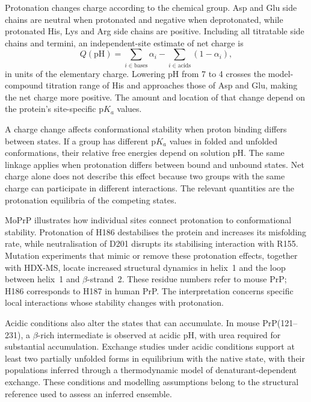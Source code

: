 Protonation changes charge according to the chemical group. Asp and Glu side chains are neutral when protonated and negative when deprotonated, while protonated His, Lys and Arg side chains are positive. Including all titratable side chains and termini, an independent-site estimate of net charge is
\begin{equation}
    Q(\mathrm{pH})=
    \sum_{i\in\text{bases}}\alpha_i
    -\sum_{i\in\text{acids}}(1-\alpha_i),
    \label{eq:bg-net-charge}
\end{equation}
in units of the elementary charge.\supercite{paceProteinIonizableGroups2009} Lowering pH from 7 to 4 crosses the model-compound titration range of His and approaches those of Asp and Glu, making the net charge more positive. The amount and location of that change depend on the protein's site-specific $\mathrm{p}K_a$ values.

A charge change affects conformational stability when proton binding differs between states. If a group has different $\mathrm{p}K_a$ values in folded and unfolded conformations, their relative free energies depend on solution pH. The same linkage applies when protonation differs between bound and unbound states.\supercite{yangPHDependenceProtein1993,onufrievProtonationPKChanges2013} Net charge alone does not describe this effect because two groups with the same charge can participate in different interactions. The relevant quantities are the protonation equilibria of the competing states.

MoPrP illustrates how individual sites connect protonation to conformational stability. Protonation of H186 destabilises the protein and increases its misfolding rate, while neutralisation of D201 disrupts its stabilising interaction with R155. Mutation experiments that mimic or remove these protonation effects, together with HDX-MS, locate increased structural dynamics in helix~1 and the loop between helix~1 and $\beta$-strand~2.\supercite{singhUnravelingMolecularMechanism2016} These residue numbers refer to mouse PrP; H186 corresponds to H187 in human PrP. The interpretation concerns specific local interactions whose stability changes with protonation.

Acidic conditions also alter the states that can accumulate. In mouse PrP(121--231), a $\beta$-rich intermediate is observed at acidic pH, with urea required for substantial accumulation.\supercite{hornemannScrapielikeUnfoldingIntermediate1998} Exchange studies under acidic conditions support at least two partially unfolded forms in equilibrium with the native state, with their populations inferred through a thermodynamic model of denaturant-dependent exchange.\supercite{moulickPartiallyUnfoldedForms2015} These conditions and modelling assumptions belong to the structural reference used to assess an inferred ensemble.


